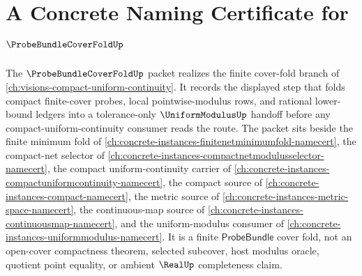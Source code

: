 \chapter{A Concrete Naming Certificate for $\ProbeBundleCoverFoldUp$}
\label{ch:concrete-instances-probe-bundle-cover-fold-namecert}

The $\ProbeBundleCoverFoldUp$ packet realizes the finite cover-fold branch of \autoref{ch:visions-compact-uniform-continuity}. It records the displayed step that folds compact finite-cover probes, local pointwise-modulus rows, and rational lower-bound ledgers into a tolerance-only $\UniformModulusUp$ handoff before any compact-uniform-continuity consumer reads the route. The packet sits beside the finite minimum fold of \autoref{ch:concrete-instances-finitenetminimumfold-namecert}, the compact-net selector of \autoref{ch:concrete-instances-compactnetmodulusselector-namecert}, the compact uniform-continuity carrier of \autoref{ch:concrete-instances-compactuniformcontinuity-namecert}, the compact source of \autoref{ch:concrete-instances-compact-namecert}, the metric source of \autoref{ch:concrete-instances-metric-space-namecert}, the continuous-map source of \autoref{ch:concrete-instances-continuousmap-namecert}, and the uniform-modulus consumer of \autoref{ch:concrete-instances-uniformmodulus-namecert}. It is a finite $\mathsf{ProbeBundle}$ cover fold, not an open-cover compactness theorem, selected subcover, host modulus oracle, quotient point equality, or ambient $\RealUp$ completeness claim.

